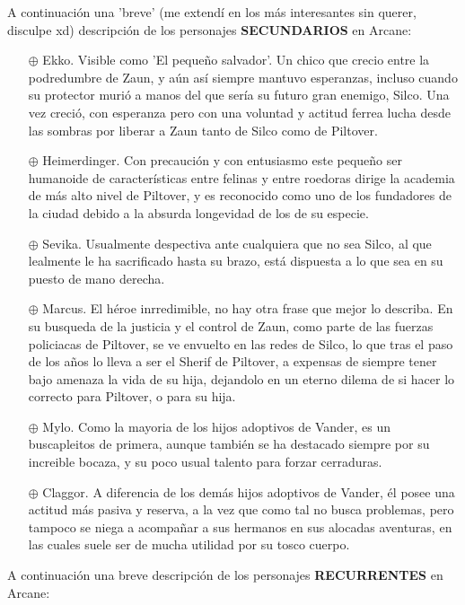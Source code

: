 \documentclass[11pt,A5]{article}
\begin{document}
A continuación una 'breve' (me extendí en los más interesantes sin querer, disculpe xd) descripción de los personajes {\textbf{SECUNDARIOS}} en Arcane:

\begin{itemize}
    \item[$\oplus$] Ekko. Visible como 'El pequeño salvador'. Un chico que crecio entre la podredumbre de Zaun, y aún así siempre mantuvo esperanzas, incluso cuando su protector murió a manos del que sería su futuro gran enemigo, Silco. Una vez creció, con esperanza pero con una voluntad y actitud ferrea lucha desde las sombras por liberar a Zaun tanto de Silco como de Piltover.
    \item[$\oplus$] Heimerdinger. Con precaución y con entusiasmo este pequeño ser humanoide de características entre felinas y entre roedoras dirige la academia de más alto nivel de Piltover, y es reconocido como uno de los fundadores de la ciudad debido a la absurda longevidad de los de su especie.
    \item[$\oplus$] Sevika. Usualmente despectiva ante cualquiera que no sea Silco, al que lealmente le ha sacrificado hasta su brazo, está dispuesta a lo que sea en su puesto de mano derecha.
    \item[$\oplus$] Marcus. El héroe inrredimible, no hay otra frase que mejor lo describa. En su busqueda de la justicia y el control de Zaun, como parte de las fuerzas policiacas de Piltover, se ve envuelto en las redes de Silco, lo que tras el paso de los años lo lleva a ser el Sherif de Piltover, a expensas de siempre tener bajo amenaza la vida de su hija, dejandolo en un eterno dilema de si hacer lo correcto para Piltover, o para su hija.
    \item[$\oplus$] Mylo. Como la mayoria de los hijos adoptivos de Vander, es un buscapleitos de primera, aunque también se ha destacado siempre por su increible bocaza, y su poco usual talento para forzar cerraduras.
    \item[$\oplus$] Claggor. A diferencia de los demás hijos adoptivos de Vander, él posee una actitud más pasiva y reserva, a la vez que como tal no busca problemas, pero tampoco se niega a acompañar a sus hermanos en sus alocadas aventuras, en las cuales suele ser de mucha utilidad por su tosco cuerpo.
\end{itemize}

A continuación una breve descripción de los personajes {\textbf{RECURRENTES}} en Arcane:
\end{document}
